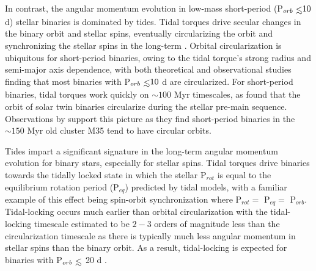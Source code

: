 In contrast, the angular momentum evolution in low-mass short-period (P$_{orb} \lsim 10$ d) stellar binaries is dominated by tides.  Tidal torques drive secular changes in the binary orbit and stellar spins, eventually circularizing the orbit and synchronizing the stellar spins in the long-term \citep{Counselman1973}. Orbital circularization is ubiquitous for short-period binaries, owing to the tidal torque's strong radius and semi-major axis dependence, with both theoretical \citep[e.g.][]{Zahn1989,Claret1995} and observational \citep[e.g.][]{Meibom2005,Mazeh2008,Lurie2017} studies finding that most binaries with P$_{orb} \lsim 10$ d are circularized. For short-period binaries, tidal torques work quickly on ${\sim}100$ Myr timescales, as \citet{Zahn1989} found that the orbit of solar twin binaries circularize during the stellar pre-main sequence.  Observations by \citet{Meibom2005} support this picture as they find short-period binaries in the ${\sim}150$ Myr old cluster M35 tend to have circular orbits.

Tides impart a significant signature in the long-term angular momentum evolution for binary stars, especially for stellar spins. Tidal torques drive binaries towards the tidally locked state in which the stellar P$_{rot}$ is equal to the equilibrium rotation period (P$_{eq}$) predicted by tidal models, with a familiar example of this effect being spin-orbit synchronization where P$_{rot} = $ P$_{eq} = $ P$_{orb}$.  Tidal-locking occurs much earlier than orbital circularization with the tidal-locking timescale estimated to be $2-3$ orders of magnitude less than the circularization timescale \citep{Zahn1989,Witte2002,Mazeh2008} as there is typically much less angular momentum in stellar spins than the binary orbit. As a result, tidal-locking is expected for binaries with P$_{orb} \lsim$ 20 d \citep[e.g.][]{Levato1974,Meibom2006,Mazeh2008,Zahn2008,Meibom2015}.


